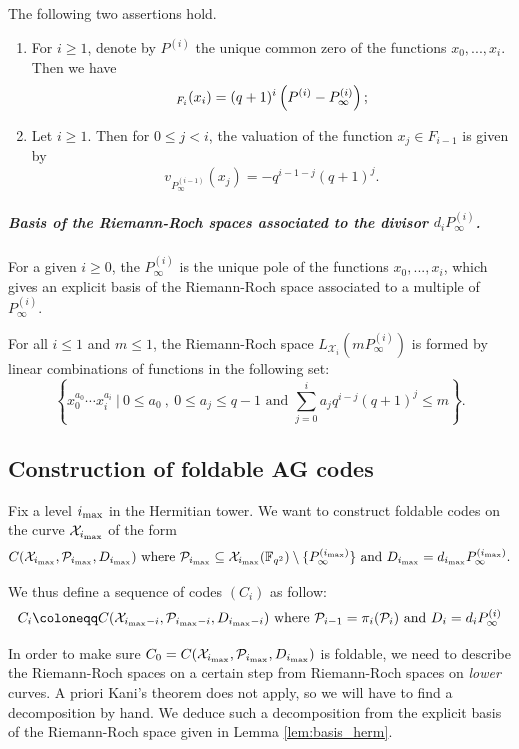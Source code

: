 \documentclass[10pt,a4paper]{article}
\newcommand\F{\mathbb{F}}
\let\div\relax\DeclareMathOperator{\div}{div}
\newcommand\calX{\mathcal{X}}
\newcommand\calP{\mathcal{P}}
\newcommand\mydef{\coloneqq}
\newcommand{\ii}{i_{\rm{max}}}
\theoremstyle{plain}
\theoremstyle{plain}
\theoremstyle{definition}
\theoremstyle{remark}
\theoremstyle{plain}
\begin{document}
\begin{lemma} \label{lem:div-princ} The following two assertions hold.
	\begin{enumerate}
		\item For $i \geq 1$, denote by $P^{(i)}$ the unique common zero of the functions $x_0,...,x_i$. Then we have
		\[\div_{F_i}(x_i) = (q+1)^i \left(P^{(i)} - P_{\infty}^{(i)}\right);\]
		\item Let $i \geq 1$. Then for $0 \leq j < i$, the valuation of the function $x_j \in F_{i-1}$ is given by
		\[v_{P_{\infty}^{(i-1)}}(x_j) = - q^{i-1-j}(q+1)^j.\]
	\end{enumerate}
\end{lemma}

\subparagraph*{Basis of the Riemann-Roch spaces associated to the divisor $d_i P_\infty^{(i)}$.}

For a given $i \geq 0$, the $P^{(i)}_{\infty}$ is the unique pole of the functions $x_0,...,x_i$, which gives an explicit basis of the Riemann-Roch space associated to a multiple of $P^{(i)}_{\infty}$.

\begin{lemma}\label{lem:basis_herm}
	For all $i \leq 1$ and $m \leq 1$, the Riemann-Roch space $L_{\calX_i}(mP^{(i)}_{\infty})$ is formed by linear combinations of functions in the following set:
	\[\left\{x_0^{a_0} \cdots x_i^{a_i} \ | \ 0 \leq a_0 \ , \ 0 \leq a_j \leq q-1 \text{ and } \sum\limits_{j=0}^i a_jq^{i-j}(q+1)^j \leq m \right\}.\]
\end{lemma}

\subsection{Construction of foldable AG codes}

Fix a level $\ii$ in the Hermitian tower. We want to construct foldable codes on the curve $\calX_{\ii}$ of the form 
\[C(\calX_{\ii},\calP_{\ii},D_{\ii}) \text{ where } \calP_{\ii} \subseteq \calX_{\ii}(\F_{q^2}) \setminus \{P_\infty^{(\ii)}\} \text{ and } D_{\ii} = d_{\ii}P^{(\ii)}_{\infty}.\]

We thus define a sequence of codes $(C_i)$ as follow:
\[C_i \mydef C(\calX_{\ii-i},\calP_{\ii-i},D_{\ii-i}) \text{ where } \calP_{i-1}=\pi_i(\calP_i)\text{ and } D_i = d_iP^{(i)}_{\infty} \]

In order to make sure $C_0=C(\calX_{\ii},\calP_{\ii},D_{\ii})$ is foldable, we need to describe the Riemann-Roch spaces on a certain step from Riemann-Roch spaces on \emph{lower} curves. A priori Kani's theorem does not apply, so we will have to find a decomposition by hand. We deduce such a decomposition  from the explicit basis of the Riemann-Roch space given in Lemma \ref{lem:basis_herm}.
\end{document}
